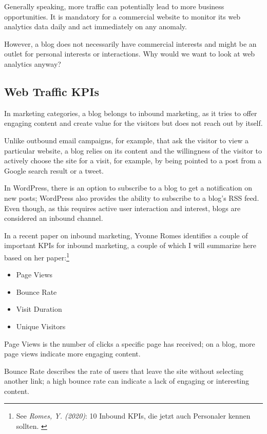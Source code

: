Generally speaking, more traffic can potentially lead to more business opportunities. It is mandatory for a commercial website to monitor its web analytics data daily and act immediately on any anomaly.

However, a blog does not necessarily have commercial interests and might be an outlet for personal interests or interactions. Why would we want to look at web analytics anyway?

\subsection{Web Traffic KPIs}

In marketing categories, a blog belongs to inbound marketing, as it tries to offer engaging content and create value for the visitors but does not reach out by itself. 

Unlike outbound email campaigns, for example, that ask the visitor to view a particular website, a blog relies on its content and the willingness of the visitor to actively choose the site for a visit, for example, by being pointed to a post from a Google search result or a tweet.

In WordPress, there is an option to subscribe to a blog to get a notification on new posts; WordPress also provides the ability to subscribe to a blog's RSS feed. Even though, as this requires active user interaction and interest, blogs are considered an inbound channel.

In a recent paper on inbound marketing, Yvonne Romes identifies a couple of important KPIs for inbound marketing, a couple of which I will summarize here based on her paper:\footnote{See \textit{Romes, Y. (2020)}: 10 Inbound KPIs, die jetzt auch Personaler kennen sollten. \cite{inboundKPI}}

\begin{itemize}
\item Page Views
\item Bounce Rate
\item Visit Duration
\item Unique Visitors
\end{itemize}

Page Views is the number of clicks a specific page has received; on a blog, more page views indicate more engaging content.

Bounce Rate describes the rate of users that leave the site without selecting another link; a high bounce rate can indicate a lack of engaging or interesting content.

